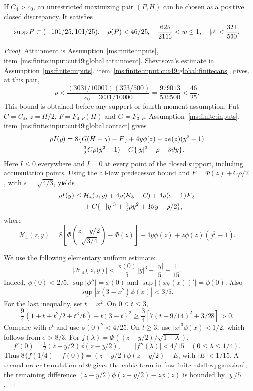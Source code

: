 \begin{lemma}\label{ms:finite:n4all:lem:owner}
If $C_4>c_0$, an unrestricted maximizing pair $(P,H)$ can be chosen
as a positive closed discrepancy. It satisfies
\begin{equation}\label{ms:finite:n4all:eq:owner-class}
 \operatorname{supp} P\subset(-101/25,101/25),\quad
 \rho(P)<46/25,\quad
 \frac{625}{2116}<w\le1,\quad |\vartheta|<\frac{321}{500}.
\end{equation}
\end{lemma}
\begin{proof}
Attainment is Assumption~\ref{ms:finite:inputs}, item~\ref{ms:finite:input:cut49:global:attainment}.
Shevtsova's estimate in Assumption~\ref{ms:finite:inputs}, item~\ref{ms:finite:input:cut49:global:finitecaps}, gives, at this pair,
\[
 \rho<\frac{(3031/10000)(323/500)}{c_0-3031/10000}
       =\frac{979013}{532500}<\frac{46}{25}.
\]
This bound is obtained before any support or fourth-moment assumption.
Put $C=C_4$, $z=H/2$, $F=F_{4,P}(H)$ and $G=F_{3,P}$.
Assumption~\ref{ms:finite:inputs}, item~\ref{ms:finite:input:cut49:global:contact} gives
\begin{align}
 \rho I(y)={}&8\{G(H-y)-F\}+4y\phi(z)+z\phi(z)(y^2-1)\notag\\
 &+\tfrac32C\rho(y^2-1)
   -C\{|y|^3-\rho-3\vartheta y\}.\label{ms:finite:n4all:eq:contact}
\end{align}
Here $I\le0$ everywhere and $I=0$ at every point of the closed
support, including accumulation points. Using the all-law predecessor
bound and $F=\Phi(z)+C\rho/2$, with $s=\sqrt{4/3}$, yields
\begin{align}
 \rho I(y)\le{}&\mathcal H_4(z,y)+4\rho(K_3-C)
                  +4\rho(s-1)K_3\notag\\
 &+C\{-|y|^3+\tfrac32\rho y^2+3\vartheta y-\rho/2\},
 \label{ms:finite:n4all:eq:predecessor}
\end{align}
where
\[
 \mathcal H_4(z,y)=
 8\left[\Phi\!\left(\frac{z-y/2}{\sqrt{3/4}}\right)-\Phi(z)\right]
 +4y\phi(z)+z\phi(z)(y^2-1).
\]

We use the following elementary uniform estimate:
\begin{equation}\label{ms:finite:n4all:eq:gaussian}
 |\mathcal H_4(z,y)|<\frac{\phi(0)}6|y|^3+\frac{|y|}{5}+\frac1{15}.
\end{equation}
Indeed, $\phi(0)<2/5$, $\sup|\phi''|=\phi(0)$ and
$\sup|(x\phi(x))'|=\phi(0)$. Also
\[
 \sup_x|x(3-x^2)\phi(x)|<3/5.
\]
For the last inequality, set $t=x^2$. On $0\le t\le3$,
\[
 \frac94(1+t+t^2/2+t^3/6)-t(3-t)^2
 \ge\frac34\left[7(t-9/14)^2+3/28\right]>0.
\]
Compare with $e^t$ and use $\phi(0)^2<4/25$.
On $t\ge3$, use $|x|^3\phi(x)<1/2$, which follows from $e>8/3$.
For $f(\lambda)=\Phi((z-y/2)/\sqrt{1-\lambda})$,
\[
 f'(0)=\tfrac12(z-y/2)\phi(z-y/2),\qquad
 |f''(\lambda)|<4/15\quad(0\le\lambda\le1/4).
\]
Thus $8\{f(1/4)-f(0)\}=(z-y/2)\phi(z-y/2)+E$, with
$|E|<1/15$. A second-order translation of $\Phi$ gives the cubic
term in \eqref{ms:finite:n4all:eq:gaussian}; the remaining difference
$(z-y/2)\phi(z-y/2)-z\phi(z)$ is bounded by $|y|/5$.


\end{proof}
